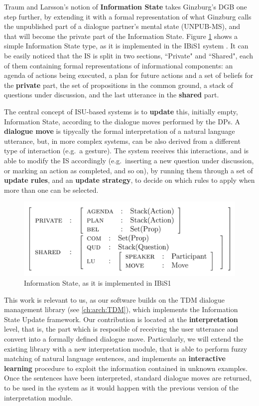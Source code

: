 Traum and Larsson's notion of \textbf{Information State} takes Ginzburg's DGB one step further, by extending it with a formal representation of what Ginzburg calls the unpublished part of a dialogue partner's mental state (UNPUB-MS), and that will become the private part of the Information State. Figure \ref{ch:rw:ds:isu:ibisis} shows a simple Information State type, as it is implemented in the IBiS1 system \citep[p. 36]{Larsson02issue-baseddialogue}. It can be easily noticed that the IS is split in two sections, ``Private" and ``Shared", each of them containing formal representations of informational components: an agenda of actions being executed, a plan for future actions and a set of beliefs for the \textbf{private} part, the set of propositions in the common ground, a stack of questions under discussion, and the last utterance in the \textbf{shared} part.

The central concept of ISU-based systems is to \textbf{update} this, initially empty, Information State, according to the dialogue moves performed by the DPs. A \textbf{dialogue move} is tipycally the formal interpretation of a natural language utterance, but, in more complex systems, can be also derived from a different type of interaction (e.g.\ a gesture). The system receives this interactions, and is able to modify the IS accordingly (e.g.\ inserting a new question under discussion, or marking an action as completed, and so on), by running them through a set of \textbf{update rules}, and an \textbf{update strategy}, to decide on which rules to apply when more than one can be selected.

\begin{figure}
	\centering
	\includegraphics{Pictures/ibis1_is.png}
	\caption{Information State, as it is implemented in IBiS1}
	\label{ch:rw:ds:isu:ibisis}
\end{figure}

This work is relevant to us, as our software builds on the TDM dialogue management library (see \ref{ch:arch:TDM}), which implements the Information State Update framework. Our contribution is located at the \textbf{interpretation} level, that is, the part which is resposible of receiving the user utterance and convert into a formally defined dialogue move. Particularly, we will extend the existing library with a new interpretation module, that is able to perform fuzzy matching of natural language sentences, and implements an \textbf{interactive learning} procedure to exploit the information contained in unknown examples. Once the sentences have been interpreted, standard dialogue moves are returned, to be used in the system as it would happen with the previous version of the interpretation module.